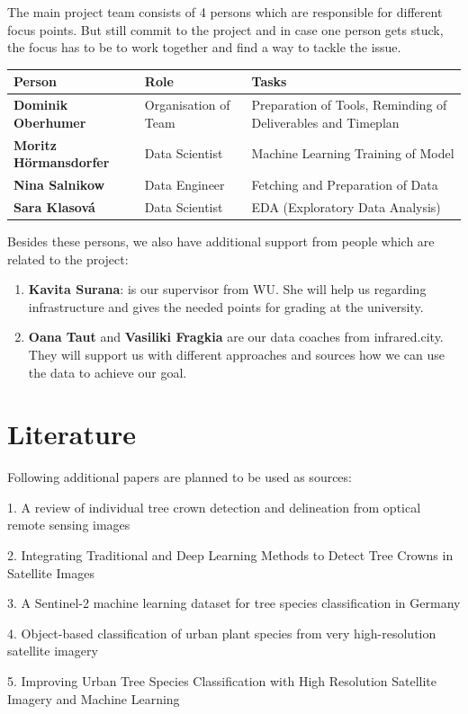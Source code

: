 \documentclass[12pt]{article}
\begin{document}
The main project team consists of 4 persons which are responsible for different focus points. But still commit to the project and in case one person gets stuck, the focus has to be to work together and find a way to tackle the issue.

\begin{table}[htbp]
\centering
\begin{tabular}{@{}llp{6cm}@{}}
\toprule
\textbf{Person} & \textbf{Role} & \textbf{Tasks} \\
\midrule
\textbf{Dominik Oberhumer} & Organisation of Team & Preparation of Tools, Reminding of Deliverables and Timeplan \\
\textbf{Moritz Hörmansdorfer} & Data Scientist & Machine Learning Training of Model \\
\textbf{Nina Salnikow} & Data Engineer & Fetching and Preparation of Data  \\
\textbf{Sara Klasová} & Data Scientist & EDA (Exploratory Data Analysis)  \\
\bottomrule
\end{tabular}
\end{table}

Besides these persons, we also have additional support from people which are related to the project:

\begin{enumerate}
    \item \textbf{Kavita Surana}: is our supervisor from WU. She will help us regarding infrastructure and gives the needed points for grading at the university.
    \item \textbf{Oana Taut} and \textbf{Vasiliki Fragkia} are our data coaches from infrared.city. They will support us with different approaches and sources how we can use the data to achieve our goal.
\end{enumerate}


\section{Literature}

Following additional papers are planned to be used as sources:

1. A review of individual tree crown detection and delineation from optical remote sensing images \cite{zheng2023reviewindividualtreecrown}

2. Integrating Traditional and Deep Learning Methods to Detect Tree Crowns in Satellite Images \cite{durgut2025integrating}

3. A Sentinel-2 machine learning dataset for tree species classification in Germany  \cite{freudenberg2025sentinel2}

4. Object-based classification of urban plant species from very high-resolution satellite imagery \cite{sicard2023object}

5. Improving Urban Tree Species Classification with High Resolution Satellite Imagery and Machine Learning \cite{wenger2024improving}


 

\end{document}
